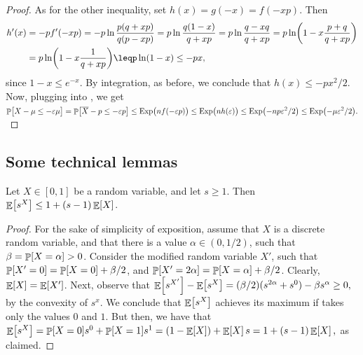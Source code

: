 \begin{proof}
    As for the other inequality, set $h(x) = g(-x) = f(-xp)$. Then
    \begin{align*}
        h'(x)%
        &=%
        -p f'(-xp)%
        =%
        -p\ln \frac{p(q+xp)}{q(p-xp)} %
        =%
        p\ln \frac{q(1-x)}{q+xp} %
        =%
        p\ln \frac{q-xq}{q+xp} %
        =%
        p\ln\pth{ 1 - x\frac{p+q}{q+xp}} %
        \\&%
        =%
        p\ln\pth{ 1 - x\frac{1}{q+xp}} %
        \leq%
        p\ln\pth{ 1 - x} %
        \leq%
        -p x,
    \end{align*}
    since $1-x \leq e^{-x}$.  By integration, as before, we conclude
    that $h(x) \leq -p x^2/2$.  Now, plugging into ,
    we get
    \begin{math}%
        \ds%
        \Prob{\bigl.{X} - \mu \leq -\eps \mu }%
        =%
        \Prob{\bigl.\overline{X} - p \leq -\eps p }%
        \leq%
        \Exp\pth{ \bigl. n f(-\eps p)}%
        \leq%
        \Exp\pth{ \bigl. n h(\eps )}%
        \leq%
        \Exp\pth{ \bigl. -n p \eps^2/2}%
        \leq%
        \Exp\pth{ \bigl. - \mu \eps^2/2}.
    \end{math}
\end{proof}

\subsection{Some technical lemmas}

\begin{lemma}
    Let $X \in [0,1]$ be a random variable, and let $s \geq 1$. Then
    $\mathop{\mathbb{E}}\!\left[ {s^X} \right] \leq 1 + (s-1)\mathop{\mathbb{E}}\!\left[ {X} \right]$.
\end{lemma}
\begin{proof}
    For the sake of simplicity of exposition, assume that $X$ is a
    discrete random variable, and that there is a value
    $\alpha \in (0,1/2)$, such that $\beta = \Prob{X = \alpha } > 0
    $.
    Consider the modified random variable $X'$, such that
    $\Prob{ X' = 0 } = \Prob{X = 0} + \beta/2$, and
    $\Prob{X' = 2\alpha } = \Prob{X = \alpha } + \beta/2$. Clearly,
    $\mathop{\mathbb{E}}\!\left[ {X} \right] = \mathop{\mathbb{E}}\!\left[ {X'} \right]$. Next, observe that
    \begin{math}
        \Ex{s^{X'}} - \Ex{s^X}%
        =%
        (\beta/2)( s^{2\alpha} + s^{0}) - \beta s^{\alpha} \geq 0,
    \end{math}
    by the convexity of $s^x$. We conclude that $ \mathop{\mathbb{E}}\!\left[ {s^X} \right]$ achieves
    its maximum if takes only the values $0$ and $1$. But then, we
    have that 
    \begin{math}
        \Ex{s^X}%
        =%
        \Prob{X=0}s^0 + \Prob{X=1}s^1%
        =%
        (1-\Ex{X}) + \Ex{X} s %
        =%
        1 + ( s-1)\Ex{X},
    \end{math}
    as claimed.
\end{proof}




